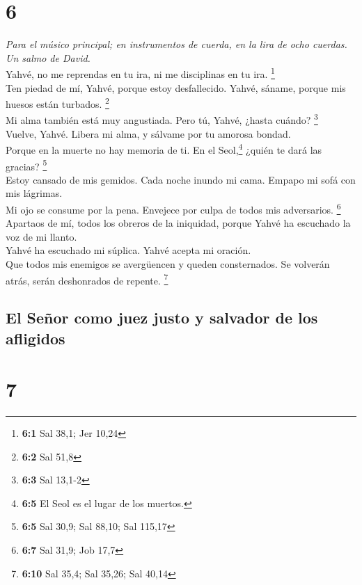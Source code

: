 \hypertarget{section-5}{%
\section{6}\label{section-5}}

\emph{Para el músico principal; en instrumentos de cuerda, en la lira de
ocho cuerdas. Un salmo de David.}\\
 Yahvé, no me reprendas en tu ira, ni me disciplinas en tu
ira. \footnote{\textbf{6:1} Sal 38,1; Jer 10,24}\\
 Ten piedad de mí, Yahvé, porque estoy desfallecido.
Yahvé, sáname, porque mis huesos están turbados. \footnote{\textbf{6:2}
  Sal 51,8}\\
 Mi alma también está muy angustiada. Pero tú, Yahvé,
¿hasta cuándo? \footnote{\textbf{6:3} Sal 13,1-2}\\
 Vuelve, Yahvé. Libera mi alma, y sálvame por tu amorosa
bondad.\\
 Porque en la muerte no hay memoria de ti. En el
Seol,\footnote{\textbf{6:5} El Seol es el lugar de los muertos.} ¿quién
te dará las gracias? \footnote{\textbf{6:5} Sal 30,9; Sal 88,10; Sal
  115,17}\\
 Estoy cansado de mis gemidos. Cada noche inundo mi cama.
Empapo mi sofá con mis lágrimas.\\
 Mi ojo se consume por la pena. Envejece por culpa de
todos mis adversarios. \footnote{\textbf{6:7} Sal 31,9; Job 17,7}\\
 Apartaos de mí, todos los obreros de la iniquidad, porque
Yahvé ha escuchado la voz de mi llanto.\\
 Yahvé ha escuchado mi súplica. Yahvé acepta mi oración.\\
 Que todos mis enemigos se avergüencen y queden
consternados. Se volverán atrás, serán deshonrados de repente.
\footnote{\textbf{6:10} Sal 35,4; Sal 35,26; Sal 40,14}

\hypertarget{el-seuxf1or-como-juez-justo-y-salvador-de-los-afligidos}{%
\subsection{El Señor como juez justo y salvador de los
afligidos}\label{el-seuxf1or-como-juez-justo-y-salvador-de-los-afligidos}}

\hypertarget{section-6}{%
\section{7}\label{section-6}}

